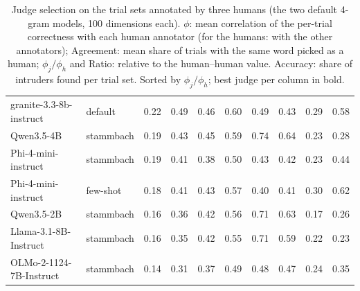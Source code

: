 \begin{table}[t]
\begin{tabular}{llrrrrrrrr}
    granite-3.3-8b-instruct & default & 0.22 & 0.49 & 0.46 & 0.60 & 0.49 & 0.43 & 0.29 & 0.58 \\
    Qwen3.5-4B & stammbach & 0.19 & 0.43 & 0.45 & 0.59 & 0.74 & 0.64 & 0.23 & 0.28 \\
    Phi-4-mini-instruct & stammbach & 0.19 & 0.41 & 0.38 & 0.50 & 0.43 & 0.42 & 0.23 & 0.44 \\
    Phi-4-mini-instruct & few-shot & 0.18 & 0.41 & 0.43 & 0.57 & 0.40 & 0.41 & 0.30 & 0.62 \\
    Qwen3.5-2B & stammbach & 0.16 & 0.36 & 0.42 & 0.56 & 0.71 & 0.63 & 0.17 & 0.26 \\
    Llama-3.1-8B-Instruct & stammbach & 0.16 & 0.35 & 0.42 & 0.55 & 0.71 & 0.59 & 0.22 & 0.23 \\
    OLMo-2-1124-7B-Instruct & stammbach & 0.14 & 0.31 & 0.37 & 0.49 & 0.48 & 0.47 & 0.24 & 0.35 \\
    \bottomrule
  \end{tabular}
  \caption{Judge selection on the trial sets annotated by three humans (the two default 4-gram models, 100 dimensions each). $\phi$: mean correlation of the per-trial correctness with each human annotator (for the humans: with the other annotators); Agreement: mean share of trials with the same word picked as a human; $\phi_j / \phi_h$ and Ratio: relative to the human--human value. Accuracy: share of intruders found per trial set. Sorted by $\phi_j / \phi_h$; best judge per column in bold.}
  \label{tab:judges}
\end{table}

